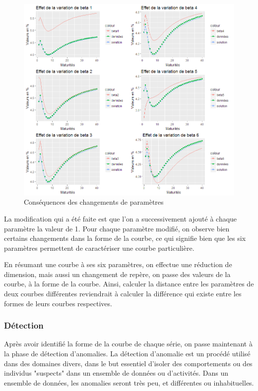 \begin{figure}[H]
\centering
\caption{Conséquences des changements de paramètres}
   \includegraphics[scale=0.7]{img/betas.png}
\end{figure}

La modification qui a été faite est que l'on a successivement ajouté à chaque paramètre la valeur de 1.
Pour chaque paramètre modifié, on observe bien certains changements dans la forme de la courbe, ce qui signifie bien que les six paramètres permettent de caractériser une courbe particulière.

En résumant une courbe à ses six paramètres, on effectue une réduction de dimension, mais aussi un changement de repère, on passe des valeurs de la courbe, à la forme de la courbe. Ainsi, calculer la distance entre les paramètres de deux courbes différentes reviendrait à calculer la différence qui existe entre les formes de leurs courbes respectives.

\subsubsection{Détection}

Après avoir identifié la forme de la courbe de chaque série, on passe maintenant à la phase de détection d'anomalies. La détection d'anomalie est un procédé utilisé dans des domaines divers, dans le but essentiel d'isoler des comportements ou des individus "suspects" dans un ensemble de données ou d'activités. Dans un ensemble de données, les anomalies seront très peu, et différentes ou inhabituelles. 

